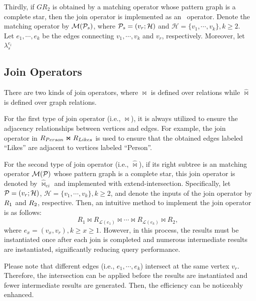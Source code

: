 Thirdly, if $GR_2$ is obtained by a matching operator whose pattern graph is a complete star, then the join operator is implemented as an \expandintersect~operator.
Denote the matching operator by $\mathcal{M}(\mathcal{P}_s)$, where $\mathcal{P}_s = (v_r; \mathcal{H})$ and $\mathcal{H} = \{v_1, \cdots, v_k\}, k \geq 2$.
Let $e_1, \cdots, e_k$ be the edges connecting $v_1, \cdots, v_k$ and $v_r$, respectively.
Moreover, let $\lambda^{e_i}_s$



\subsection{Join Operators}
\label{sec:join-operator}
There are two kinds of join operators, where $\Join$ is defined over relations while $\widehat{\Join}$ is defined over graph relations.

For the first type of join operator (i.e., $\Join$), it is always utilized to ensure the adjacency relationships between vertices and edges.
For example, the join operator in ${R_{Person}} \Join {\ensuremath R_{Likes}}$ is used to ensure that the obtained edges labeled ``Likes'' are adjacent to vertices labeled ``Person''.




For the second type of join operator (i.e., $\widehat{\Join}$), if its right subtree is an matching operator $\mathcal{M}(\mathcal{P})$ whose pattern graph is a complete star, this join operator is denoted by $\widehat{\Join}_{ei}$ and implemented with extend-intersection.
Specifically, let \(\mathcal{P} = (v_r; \mathcal{H})\), $\mathcal{H} = \{v_1, \cdots, v_k\}, k \geq 2$, and denote the inputs of the join operator by ${R_{1}}$ and ${R_{2}}$, respective.
Then, an intuitive method to implement the join operator is as follows:
\begin{equation*}
    R_{1} \Join R_{\mathcal{L}(e_1)} \Join \cdots \Join R_{\mathcal{L}(e_k)} \Join R_{2},
\end{equation*}
where $e_x = (v_x, v_r), k \geq x \geq 1$.
However, in this process, the results must be instantiated once after each join is completed and numerous intermediate results are instantiated, significantly reducing query performance.

Please note that different edges (i.e., $e_1, \cdots, e_k$) intersect at the same vertex $v_r$.
Therefore, the intersection can be applied before the results are instantiated and fewer intermediate results are generated.
Then, the efficiency can be noticeably enhanced.


